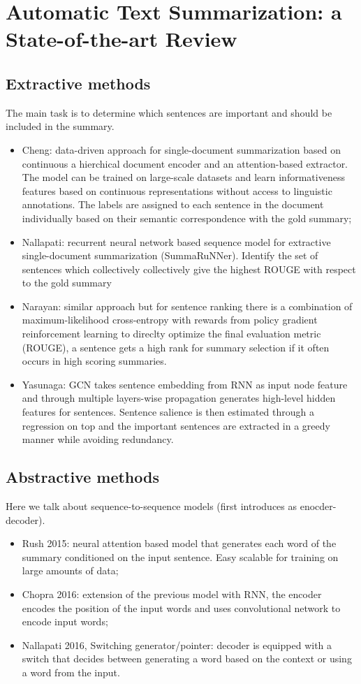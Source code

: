 \documentclass[12pt]{article}
\begin{document}
\section{Automatic Text Summarization: a State-of-the-art Review}
\subsection{Extractive methods}
The main task is to determine which sentences are important and should 
be included in the summary. 
\begin{itemize}
    \item Cheng: data-driven approach for single-document summarization based on continuous a 
    hierchical document encoder and an attention-based extractor. The model can be trained on large-scale
    datasets and learn informativeness features based on continuous representations without 
    access to linguistic annotations. The labels are assigned to each sentence in the 
    document individually based on their semantic correspondence with the gold summary;
    \item Nallapati: recurrent neural network based sequence model for extractive single-document
    summarization (SummaRuNNer). Identify the set of sentences which collectively collectively give the 
    highest ROUGE with respect to the gold summary
    \item Narayan: similar approach but for sentence ranking there is a combination of maximum-likelihood cross-entropy
    with rewards from policy gradient reinforcement learning to direclty optimize the final evaluation
    metric (ROUGE), a sentence gets a high rank for summary selection if it often occurs in high
    scoring summaries.
    \item Yasunaga: GCN takes sentence embedding from RNN as input node feature and through 
    multiple layers-wise propagation generates high-level hidden features for sentences. Sentence salience is then estimated
    through a regression on top and the important sentences are extracted in a greedy 
    manner while avoiding redundancy.
\end{itemize}
\subsection{Abstractive methods}
Here we talk about sequence-to-sequence models (first introduces as enocder-decoder).
\begin{itemize}
    \item Rush 2015: neural attention based model that generates each word of the summary
    conditioned on the input sentence. Easy scalable for training on large amounts of data;
    \item Chopra 2016: extension of the previous model with RNN, the encoder encodes the position of the
    input words and uses convolutional network to encode input words;
    \item  Nallapati 2016, Switching generator/pointer: decoder is equipped with a switch that decides
    between generating a word based on the context or using a word from the input.
\end{itemize}
\end{document}
